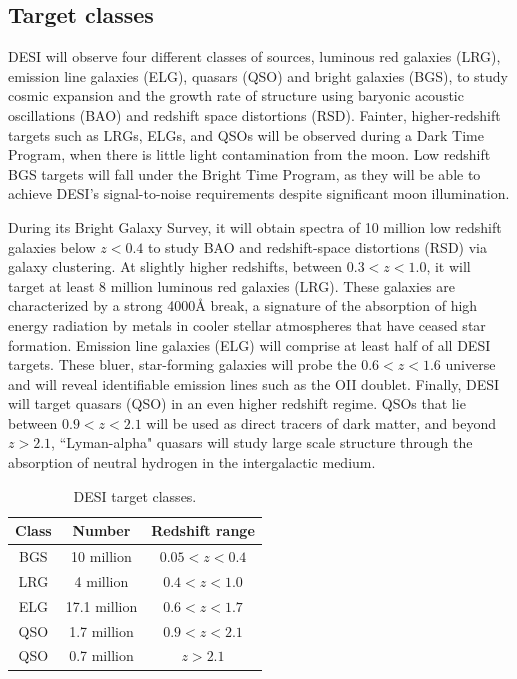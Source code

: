 \subsection{Target classes}

DESI will observe four different classes of sources, luminous red galaxies (LRG), emission line galaxies (ELG), quasars (QSO) and bright galaxies (BGS), to study cosmic expansion and the growth rate of structure using baryonic acoustic oscillations (BAO) and redshift space distortions (RSD). Fainter, higher-redshift targets such as LRGs, ELGs, and QSOs will be observed during a Dark Time Program, when there is little light contamination from the moon. Low redshift BGS targets will fall under the Bright Time Program, as they will be able to achieve DESI's signal-to-noise requirements despite significant moon illumination.

During its Bright Galaxy Survey, it will obtain spectra of 10 million low redshift galaxies below $z<0.4$ to study BAO and redshift-space distortions (RSD) via galaxy clustering. At slightly higher redshifts, between $0.3<z<1.0$, it will target at least 8 million luminous red galaxies (LRG). These galaxies are characterized by a strong 4000$\mbox{\AA}$ break, a signature of the absorption of high energy radiation by metals in cooler stellar atmospheres that have ceased star formation. Emission line galaxies (ELG) will comprise at least half of all DESI targets. These bluer, star-forming galaxies will probe the $0.6<z<1.6$ universe and will reveal identifiable emission lines such as the OII doublet. 
Finally, DESI will target quasars (QSO) in an even higher redshift regime. QSOs that lie between $0.9<z<2.1$ will be used as direct tracers of dark matter, and beyond $z>2.1$, ``Lyman-alpha" quasars will study large scale structure through the absorption of neutral hydrogen in the intergalactic medium. 

\begin{table}
\caption{DESI target classes.}
\label{tab:5sigma}
\centering
\begin{tabular}{|c|c|c|}
  \hline
  Class & Number & Redshift range\\
  \hline \hline
  BGS & 10 million & $0.05<z<0.4$ \\
  \hline
  LRG & 4 million & $0.4<z<1.0$ \\
  \hline
  ELG & 17.1 million & $0.6<z<1.7$ \\
  \hline
  QSO & 1.7 million & $0.9<z<2.1$ \\
  \hline
  QSO & 0.7 million & $z>2.1$\\
  \hline
\end{tabular}
\end{table}\\

